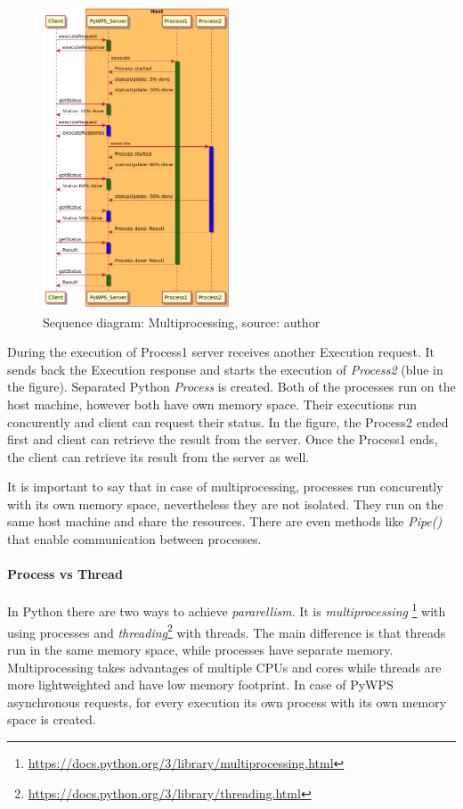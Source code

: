 \documentclass{gifce}
\begin{document}
\begin{figure}[h!]
\centering
\includegraphics[width=0.5\textwidth]{img/Diag_multiprocessing.png}
\caption{Sequence diagram: Multiprocessing, source: author}
\label{fig:Diag_multiprocessing}
\end{figure}

During the execution of Process1 server receives another Execution request. It sends back the Execution response and starts the execution
of \textit{Process2} (blue in the figure). Separated Python \textit{Process} is created. Both of the processes run on the host machine, however both have own memory
space. Their executions run concurently and client can request their status. In the figure, the Process2 ended first and client can retrieve
the result from the server. Once the Process1 ends, the client can retrieve its result from the server as well.

It is important to say that in case of multiprocessing, processes run concurently with its own memory space, nevertheless they are not isolated.
They run on the same host machine and share the resources. There are even methods like \textit{Pipe()} that enable communication between 
processes.

\paragraph{Process vs Thread} In Python there are two ways to achieve \textit{pararellism}. It is \textit{multiprocessing}
\footnote{\url{https://docs.python.org/3/library/multiprocessing.html}} with using processes and \textit{threading}\footnote{\url{https://docs.python.org/3/library/threading.html}} with threads. The main difference is that threads run in the same memory space, while processes
have separate memory. Multiprocessing takes advantages of multiple CPUs and cores while threads are more lightweighted and have low memory
footprint. In case of PyWPS asynchronous requests, for every execution its own process with its own memory space is created.
\end{document}
